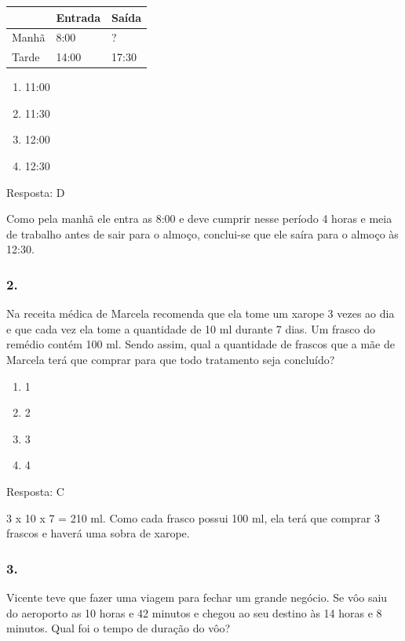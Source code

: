 \begin{longtable}[]{@{}lll@{}}
\toprule
& Entrada & Saída\tabularnewline
\midrule
\endhead
Manhã & 8:00 & ?\tabularnewline
Tarde & 14:00 & 17:30\tabularnewline
\bottomrule
\end{longtable}

\begin{enumerate}
\def\labelenumi{\alph{enumi})}
\item
  11:00
\item
  11:30
\item
  12:00
\item
  12:30
\end{enumerate}

Resposta: D

Como pela manhã ele entra as 8:00 e deve cumprir nesse período 4 horas e
meia de trabalho antes de sair para o almoço, conclui-se que ele saíra
para o almoço às 12:30.

\subsubsection{2.}\label{section-62}

Na receita médica de Marcela recomenda que ela tome um xarope 3 vezes ao
dia e que cada vez ela tome a quantidade de 10 ml durante 7 dias. Um
frasco do remédio contém 100 ml. Sendo assim, qual a quantidade de
frascos que a mãe de Marcela terá que comprar para que todo tratamento
seja concluído?

\begin{enumerate}
\def\labelenumi{\alph{enumi})}
\item
  1
\item
  2
\item
  3
\item
  4
\end{enumerate}

Resposta: C

3 x 10 x 7 = 210 ml. Como cada frasco possui 100 ml, ela terá que
comprar 3 frascos e haverá uma sobra de xarope.

\subsubsection{3.}\label{section-63}

Vicente teve que fazer uma viagem para fechar um grande negócio. Se vôo
saiu do aeroporto as 10 horas e 42 minutos e chegou ao seu destino às 14
horas e 8 minutos. Qual foi o tempo de duração do vôo?

